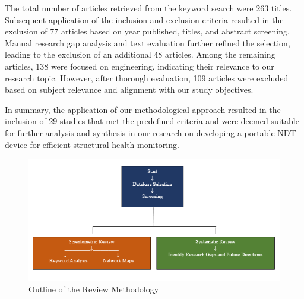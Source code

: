 \documentclass[journal, a4paper]{IEEEtran}
\begin{document}
The total number of articles retrieved from the keyword search were 263 titles.
Subsequent application of the inclusion and exclusion criteria resulted in the exclusion of
77 articles based on year published, titles, and abstract screening. Manual research gap analysis
and text evaluation further refined the selection, leading to the exclusion of an additional 48 articles.
Among the remaining articles, 138 were focused on engineering, indicating their relevance to our research topic.
However, after thorough evaluation, 109 articles were excluded based on subject relevance and alignment with our study objectives.

In summary, the application of our  methodological approach resulted in the inclusion of
29 studies that met the predefined criteria and were deemed suitable for further analysis and
synthesis in our research on developing a portable NDT device for efficient structural health monitoring.


\begin{figure}[h]
  \centering
  \includegraphics[width=\columnwidth]{./img/split_glowchart.png}
  \caption{Outline of the Review Methodology}
  \label{fig:paperSearch}
\end{figure}
\end{document}
